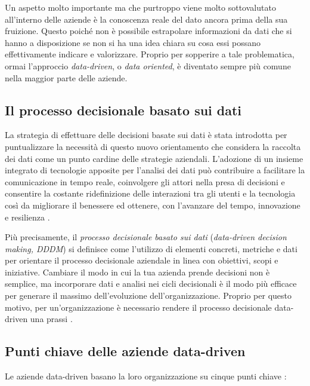 Un aspetto molto importante ma che purtroppo viene molto sottovalutato all'interno delle aziende è la conoscenza reale del dato ancora prima della sua fruizione. Questo poiché non è possibile estrapolare informazioni da dati che si hanno a disposizione se non si ha una idea chiara su cosa essi possano effettivamente indicare e valorizzare. Proprio per sopperire a tale problematica, ormai l'approccio \textit{data-driven}, o \textit{data oriented}, è diventato sempre più comune nella maggior parte delle aziende.

\subsection{Il processo decisionale basato sui dati}

La strategia di effettuare delle decisioni basate sui dati è stata introdotta per puntualizzare la necessità di questo nuovo orientamento che considera la raccolta dei dati come un punto cardine delle strategie aziendali. L'adozione di un insieme integrato di tecnologie apposite per l'analisi dei dati può contribuire a facilitare la comunicazione in tempo reale, coinvolgere gli attori nella presa di decisioni e consentire la costante ridefinizione delle interazioni tra gli utenti e la tecnologia così da migliorare il benessere ed ottenere, con l'avanzare del tempo, innovazione e resilienza \cite{emerald_data_driven_orientation}.

Più precisamente, il \textit{processo decisionale basato sui dati} (\textit{data-driven decision making, DDDM}) si definisce come l'utilizzo di elementi concreti, metriche e dati per orientare il processo decisionale aziendale in linea con obiettivi, scopi e iniziative. Cambiare il modo in cui la tua azienda prende decisioni non è semplice, ma incorporare dati e analisi nei cicli decisionali è il modo più efficace per generare il massimo dell'evoluzione dell'organizzazione. Proprio per questo motivo, per un'organizzazione è necessario rendere il processo decisionale data-driven una prassi \cite{tableau_data_driven_decision_making}.

\subsection{Punti chiave delle aziende data-driven}
Le aziende data-driven basano la loro organizzazione su cinque punti chiave \cite{researchgate_data_driven_orientation}:

